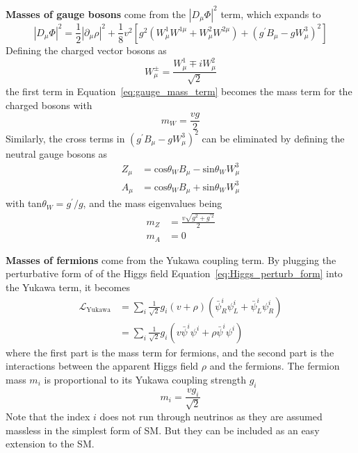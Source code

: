 \textbf{Masses of gauge bosons} come from the $|D_{\mu}\Phi|^2$ term, which expands to
\begin{equation}\label{eq:gauge_mass_term}
    |D_{\mu}\Phi|^{2} = \frac{1}{2}|\partial_{\mu}\rho|^{2} 
                       + \frac{1}{8}v^{2} [g^{2}(W^{1}_{\mu}W^{1\mu} + W^{2}_{\mu}W^{2\mu}) + (g^{\prime}B_{\mu}-gW^{3}_{\mu})^{2}]
\end{equation}
Defining the charged vector bosons as 
\begin{equation}\label{eq:W_boson_def}
    W^{\pm}_{\mu} = \frac{W^{1}_{\mu} \mp iW^{2}_{\mu}}{\sqrt{2}}
\end{equation}
the first term in Equation~\ref{eq:gauge_mass_term} becomes the mass term for the charged bosons with
\begin{equation}\label{eq:W_mass}
    m_{W} = \frac{vg}{2}
\end{equation}
Similarly, the cross terms in $(g^{\prime}B_{\mu}-gW^{3}_{\mu})^{2}$ can be eliminated by defining the neutral gauge bosons as
\begin{equation}
  \begin{split}
    Z_{\mu} & = \text{cos}\theta_{W} B_{\mu} - \text{sin}\theta_{W} W^{3}_{\mu} \\
    A_{\mu} & = \text{cos}\theta_{W} B_{\mu} + \text{sin}\theta_{W} W^{3}_{\mu}
  \end{split}
\end{equation}
with tan$\theta_{W} = g^{\prime}/g$, and the mass eigenvalues being
\begin{equation}
  \begin{split}
    m_{Z} & = \frac{v\sqrt{g^{2}+g^{\prime 2}}}{2} \\
    m_{A} & = 0
  \end{split}
\end{equation}

\textbf{Masses of fermions} come from the Yukawa coupling term.
By plugging the perturbative form of of the Higgs field Equation~\ref{eq:Higgs_perturb_form} into the Yukawa term, it becomes
\begin{equation}\label{eq:Lagrangian_yukawa}
  \begin{split}
    \mathcal{L}_{\text{Yukawa}} & = \sum_{i} \frac{1}{\sqrt{2}} g_{i} (v+\rho) (\bar{\psi}^{i}_{R}\psi^{i}_{L} + \bar{\psi}^{i}_{L}\psi^{i}_{R}) \\
                                & = \sum_{i} \frac{1}{\sqrt{2}} g_{i} (v\bar{\psi}^{i}\psi^{i} + \rho \bar{\psi}^{i}\psi^{i})
  \end{split}
\end{equation}
where the first part is the mass term for fermions, 
and the second part is the interactions between the apparent Higgs field $\rho$ and the fermions.
The fermion mass $m_{i}$ is proportional to its Yukawa coupling strength $g_{i}$
\begin{equation}\label{eq:fermion_mass}
    m_{i} = \frac{vg_{i}}{\sqrt{2}}
\end{equation} 
Note that the index $i$ does not run through neutrinos as they are assumed massless in the simplest form of SM.
But they can be included as an easy extension to the SM.

